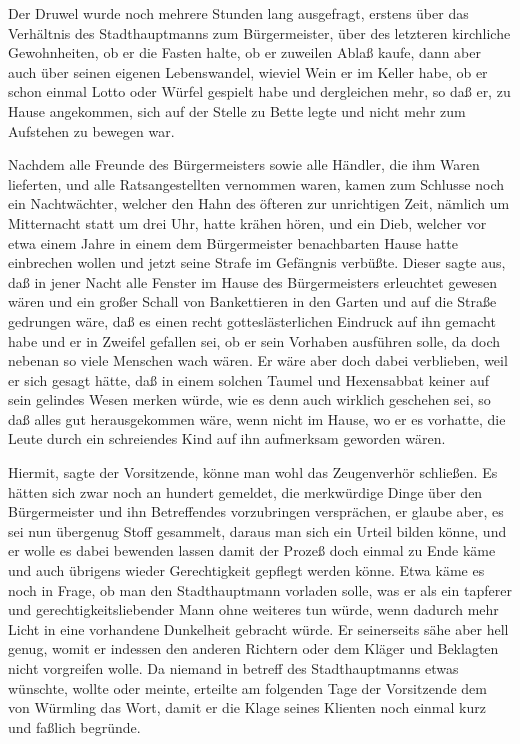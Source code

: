 Der Druwel wurde noch mehrere Stunden lang ausgefragt, erstens über
das Verhältnis des Stadthauptmanns zum Bürgermeister, über des
letzteren kirchliche Gewohnheiten, ob er die Fasten halte, ob er
zuweilen Ablaß kaufe, dann aber auch über seinen eigenen
Lebenswandel, wieviel Wein er im Keller habe, ob er schon einmal
Lotto oder Würfel gespielt habe und dergleichen mehr, so daß er, zu
Hause angekommen, sich auf der Stelle zu Bette legte und nicht mehr
zum Aufstehen zu bewegen war.

Nachdem alle Freunde des Bürgermeisters sowie alle Händler, die ihm
Waren lieferten, und alle Ratsangestellten vernommen waren, kamen
zum Schlusse noch ein Nachtwächter, welcher den Hahn des öfteren
zur unrichtigen Zeit, nämlich um Mitternacht statt um drei Uhr,
hatte krähen hören, und ein Dieb, welcher vor etwa einem Jahre in
einem dem Bürgermeister benachbarten Hause hatte einbrechen wollen
und jetzt seine Strafe im Gefängnis verbüßte. Dieser sagte aus, daß
in jener Nacht alle Fenster im Hause des Bürgermeisters erleuchtet
gewesen wären und ein großer Schall von Bankettieren in den Garten
und auf die Straße gedrungen wäre, daß es einen recht
gotteslästerlichen Eindruck auf ihn gemacht habe und er in Zweifel
gefallen sei, ob er sein Vorhaben ausführen solle, da doch nebenan
so viele Menschen wach wären. Er wäre aber doch dabei verblieben,
weil er sich gesagt hätte, daß in einem solchen Taumel und
Hexensabbat keiner auf sein gelindes Wesen merken würde, wie es
denn auch wirklich geschehen sei, so daß alles gut herausgekommen
wäre, wenn nicht im Hause, wo er es vorhatte, die Leute
\pagenum{[32]}durch ein schreiendes Kind auf ihn aufmerksam
geworden wären.

Hiermit, sagte der Vorsitzende, könne man wohl das Zeugenverhör
schließen. Es hätten sich zwar noch an hundert gemeldet, die
merkwürdige Dinge über den Bürgermeister und ihn Betreffendes
vorzubringen versprächen, er glaube aber, es sei nun übergenug
Stoff gesammelt, daraus man sich ein Urteil bilden könne, und er
wolle es dabei bewenden lassen damit der Prozeß doch einmal zu Ende
käme und auch übrigens wieder Gerechtigkeit gepflegt werden könne.
Etwa käme es noch in Frage, ob man den Stadthauptmann vorladen
solle, was er als ein tapferer und gerechtigkeitsliebender Mann
ohne weiteres tun würde, wenn dadurch mehr Licht in eine vorhandene
Dunkelheit gebracht würde. Er seinerseits sähe aber hell genug,
womit er indessen den anderen Richtern oder dem Kläger und
Beklagten nicht vorgreifen wolle. Da niemand in betreff des
Stadthauptmanns etwas wünschte, wollte oder meinte, erteilte am
folgenden Tage der Vorsitzende dem von Würmling das Wort, damit er
die Klage seines Klienten noch einmal kurz und faßlich begründe.

